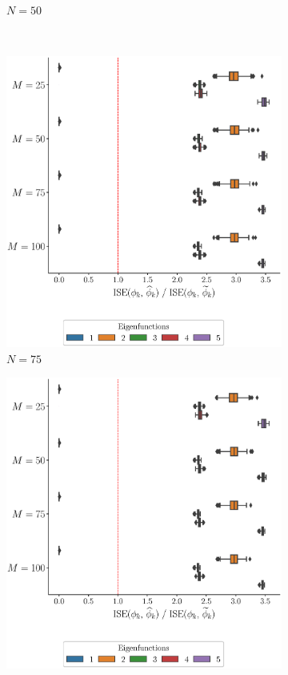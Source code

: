 \begin{results}
\begin{figure}
\begin{subfigure}[b]{0.49\textwidth}
         \caption{$N = 50$}
         \label{fig:ise_mfd_2d_50}
     \end{subfigure}
     \\
     \begin{subfigure}[b]{0.49\textwidth}
         \centering
         \includegraphics[width=\textwidth]{figures/scenario_2/ise_N75.eps}
         \caption{$N = 75$}
         \label{fig:ise_mfd_2d_75}
     \end{subfigure}
     \begin{subfigure}[b]{0.49\textwidth}
         \centering
         \includegraphics[width=\textwidth]{figures/scenario_2/ise_N100.eps}

\end{subfigure}
\end{figure}
\end{results}
